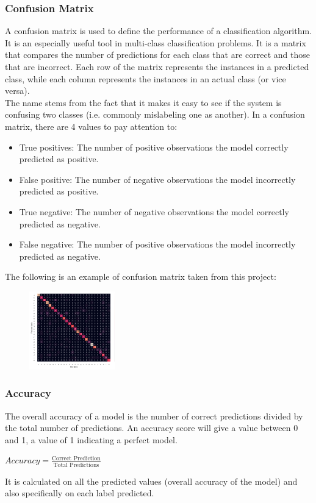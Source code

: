 \documentclass{article}
\begin{document}
\subsubsection*{Confusion Matrix}
A confusion matrix is used to define the performance of a classification algorithm. It is an especially useful tool in multi-class classification problems. It is a matrix that compares the number of predictions for each class that are correct and those that are incorrect. Each row of the matrix represents the instances in a predicted class, while each column represents the instances in an actual class (or vice versa).\\ The name stems from the fact that it makes it easy to see if the system is confusing two classes (i.e. commonly mislabeling one as another).  
In a confusion matrix, there are 4 values to pay attention to:
\begin{itemize}
    \item True positives: The number of positive observations the model correctly predicted as positive.
    \item False positive: The number of negative observations the model incorrectly predicted as positive.
    \item True negative: The number of negative observations the model correctly predicted as negative.
    \item False negative: The number of positive observations the model incorrectly predicted as negative.
\end{itemize}
The following is an example of confusion matrix taken from this project:
\begin{figure}[H]
        \begin{center}
        \includegraphics[width=0.33\textwidth]{cm.png}
        \end{center}
\end{figure} 

\subsubsection*{Accuracy}
The overall accuracy of a model is the number of correct predictions divided by the total number of predictions. An accuracy score will give a value between 0 and 1, a value of 1 indicating a perfect model.
\begin{center}
    \begin{math}
Accuracy = \frac{\mbox{Correct Prediction}}{\mbox{Total Predictions}}
\end{math}
\end{center}
It is calculated on all the predicted values (overall accuracy of the model) and also specifically on each label predicted. 
\end{document}
